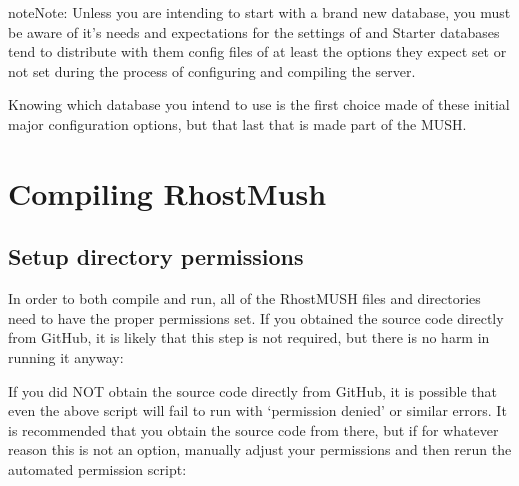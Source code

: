 \documentclass[letterpaper,10pt,english]{sphinxmanual}
\begin{document}
\begin{sphinxadmonition}{note}{Note:}
\sphinxAtStartPar
Unless you are intending to start with a brand new database, you must be
aware of it’s needs and expectations for the settings of  and
 Starter databases tend to distribute with them config
files of at least the options they expect set or not set during the process
of configuring and compiling the server.

\sphinxAtStartPar
Knowing which database you intend to use is the first choice made of these
initial major configuration options, but that last that is made part of the
MUSH.
\end{sphinxadmonition}


\section{Compiling RhostMush}
\label{\detokenize{install:compiling-rhostmush}}\label{\detokenize{install:id6}}

\subsection{Setup directory permissions}
\label{\detokenize{install:setup-directory-permissions}}
\sphinxAtStartPar
In order to both compile and run, all of the RhostMUSH files and directories
need to have the proper permissions set. If you obtained the source code
directly from GitHub, it is likely that this step is not required, but there
is no harm in running it anyway:

\begin{sphinxVerbatim}[commandchars=\\\{\}]
\end{sphinxVerbatim}

\sphinxAtStartPar
If you did NOT obtain the source code directly from GitHub, it is possible that
even the above script will fail to run with ‘permission denied’ or similar
errors. It is recommended that you obtain the source code from there, but if
for whatever reason this is not an option, manually adjust your permissions
and then re\sphinxhyphen{}run the automated permission script:

\begin{sphinxVerbatim}[commandchars=\\\{\}]
      
\end{sphinxVerbatim}
\end{document}
